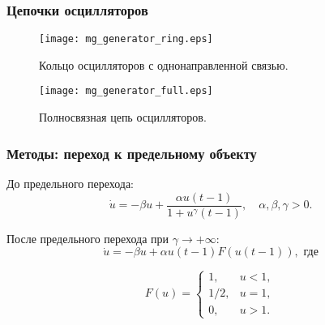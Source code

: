 \begin{frame}
	\frametitle{Цепочки осцилляторов}
	
	\begin{figure}
		\begin{minipage}[b]{0.45\linewidth}
			\centering
			\texttt{[image: mg\_generator\_ring.eps]}
			\caption{Кольцо осцилляторов с однонаправленной связью.}
			\label{fig:ring:intro}
		\end{minipage}
		\hspace{0.5cm}
		\begin{minipage}[b]{0.45\linewidth}
			\centering
			\texttt{[image: mg\_generator\_full.eps]}
			\caption{Полносвязная цепь осцилляторов.}
			\label{fig:full_mesh:intro}
		\end{minipage}
	\end{figure}
	
\end{frame}

\begin{frame}
	\frametitle{Методы: переход к предельному объекту}
	
	До предельного перехода:
	\begin{equation*}
		\dot{u}=-\beta u + \frac{\alpha u(t - 1)}{1 + u^{\gamma}(t - 1)}, 
		\quad \alpha, \beta, \gamma > 0.
	\end{equation*}
	
	\pause
	
	После предельного перехода при $\gamma \to +\infty$:
	\begin{equation*}
		\dot{u}=-\beta u + \alpha u(t - 1) F(u(t - 1)), \text{ где}
	\end{equation*}
	
	\[
	F(u) = \begin{cases}
				1, & u < 1,\\
				1/2, & u = 1,\\
				0, & u > 1.
			\end{cases}
	\]
	
\end{frame}

